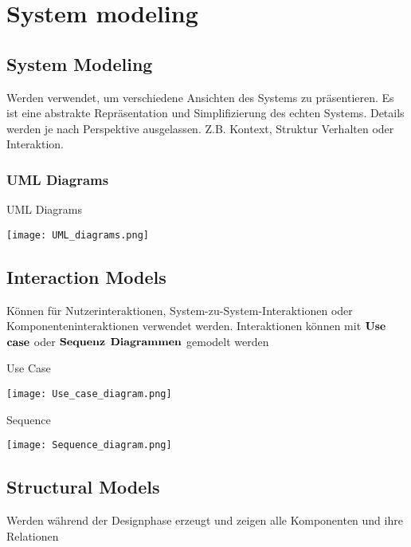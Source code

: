 \section{System modeling}
\subsection{System Modeling}
Werden verwendet, um verschiedene Ansichten des Systems zu präsentieren. \newline
Es ist eine abstrakte Repräsentation und Simplifizierung des echten Systems. Details werden je nach Perspektive ausgelassen. Z.B. Kontext, Struktur Verhalten oder Interaktion.
\subsubsection{UML Diagrams} 
\begin{table}[H]
\caption{UML Diagrams}
\texttt{[image: UML\_diagrams.png]}
\end{table}
\subsection{Interaction Models}
Können für Nutzerinteraktionen, System-zu-System-Interaktionen oder Komponenteninteraktionen verwendet werden. \newline
Interaktionen können mit $\bold{Use}$ $\bold{case}$ oder $\bold{Sequenz}$ $\bold{Diagrammen}$ gemodelt werden
\begin{table}[H]
\caption{Use Case}
\texttt{[image: Use\_case\_diagram.png]}
\end{table}
\begin{table}[H]
\caption{Sequence}
\texttt{[image: Sequence\_diagram.png]}
\end{table}
\subsection{Structural Models}
Werden während der Designphase erzeugt und zeigen alle Komponenten und ihre Relationen
